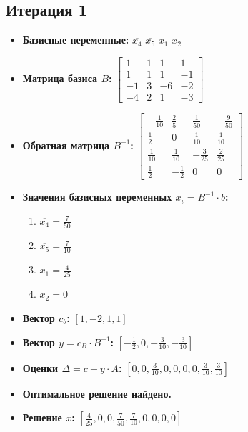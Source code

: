 \begin{itemize}
\subsection*{Итерация 1}
\begin{itemize}
\item \textbf{Базисные переменные:}
$\overline{x_{4}}$
$\overline{x_{5}}$
$x_{1}$
$x_{2}$
\item \textbf{Матрица базиса $B$:}
$\left[\begin{matrix}1 & 1 & 1 & 1\\1 & 1 & 1 & -1\\-1 & 3 & -6 & -2\\-4 & 2 & 1 & -3\end{matrix}\right]$
\item \textbf{Обратная матрица $B^{-1}$:}
$\left[\begin{matrix}- \frac{1}{10} & \frac{2}{5} & \frac{1}{50} & - \frac{9}{50}\\\frac{1}{2} & 0 & \frac{1}{10} & \frac{1}{10}\\\frac{1}{10} & \frac{1}{10} & - \frac{3}{25} & \frac{2}{25}\\\frac{1}{2} & - \frac{1}{2} & 0 & 0\end{matrix}\right]$
\item \textbf{Значения базисных переменных $ x_i = B^{-1} \cdot b$:}
\begin{enumerate}
\item $\overline{x_{4}} = \frac{7}{50}$
\item $\overline{x_{5}} = \frac{7}{10}$
\item $x_{1} = \frac{4}{25}$
\item $x_{2} = 0$
\end{enumerate}
\item \textbf{Вектор $c_b$:}
$[1, -2, 1, 1]$
\item \textbf{Вектор $y = c_B \cdot B^{-1}$:}
$[- \frac{1}{2}, 0, - \frac{3}{10}, - \frac{3}{10}]$
\item \textbf{Оценки $\Delta = c - y \cdot A$:}
$[0, 0, \frac{3}{10}, 0, 0, 0, 0, \frac{3}{10}, \frac{3}{10}]$
\item \textbf{Оптимальное решение найдено.}
\item \textbf{Решение $x$:}
$[\frac{4}{25}, 0, 0, \frac{7}{50}, \frac{7}{10}, 0, 0, 0, 0]$
\end{itemize}
\end{itemize}
